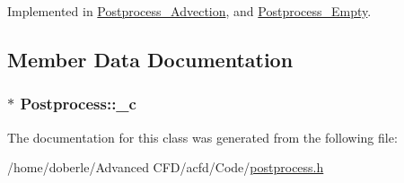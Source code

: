 Implemented in \hyperlink{class_postprocess___advection_a7df2f5694b2d345b8e7f19a5de18aa9d}{Postprocess\+\_\+\+Advection}, and \hyperlink{class_postprocess___empty_a4ff530ac6ee362ba6d15b4cdffc1d596}{Postprocess\+\_\+\+Empty}.



\subsection{Member Data Documentation}
\subsubsection[{\texorpdfstring{\+\_\+c}{_c}}]{$\ast$ Postprocess\+::\+\_\+c\hspace{0.3cm}{\ttfamily [protected]}}\hypertarget{class_postprocess_a808baccc80afb5cb6a3c28650001357a}{}\label{class_postprocess_a808baccc80afb5cb6a3c28650001357a}


The documentation for this class was generated from the following file\+:\begin{DoxyCompactItemize}
\item 
/home/doberle/\+Advanced C\+F\+D/acfd/\+Code/\hyperlink{postprocess_8h}{postprocess.\+h}\end{DoxyCompactItemize}
